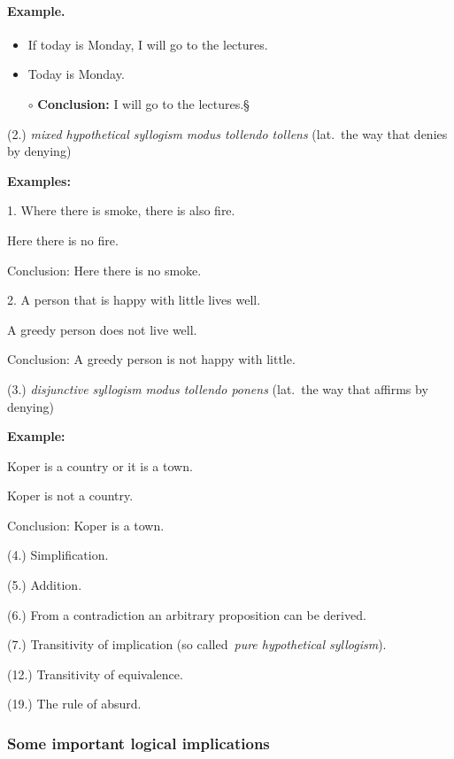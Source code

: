 \documentclass[11pt,paper=b5,footinclude,headinclude]{scrbook} %
\def\kz{{\hfill{\S}}}%
\theoremstyle{remark}
\theoremstyle{definition} %
\theoremstyle{theorem} %
\begin{document}
\paragraph{Example.}
\begin{itemize}
    \item If today is Monday, I will go to the lectures.
    \item Today is Monday.
    \item[$\circ$] \textbf{Conclusion:} I will go to the lectures.\kz
\end{itemize}


\medskip

(2.) {\em mixed hypothetical syllogism} {\em modus tollendo tollens} (lat.~the way that denies by denying)

\textbf{ Examples:}

1. Where there is smoke, there is also fire.

Here there is no fire.

Conclusion: Here there is no smoke.

2. A person that is happy with little lives well.

A greedy person does not live well.

Conclusion: A greedy person is not happy with little.


(3.) {\em disjunctive syllogism} {\em modus tollendo ponens}
(lat.~the way that affirms by denying)


\medskip
\textbf{ Example:}

Koper is a country or it is a town.

Koper is not a country.

Conclusion: Koper is a town.

(4.) Simplification.

(5.) Addition.

(6.) From a contradiction an arbitrary proposition can be derived.

(7.) Transitivity of implication (so called~{\em pure hypothetical syllogism}).

(12.) Transitivity of equivalence.

(19.) The rule of absurd.

\subsubsection*{Some important logical implications}
\end{document}
